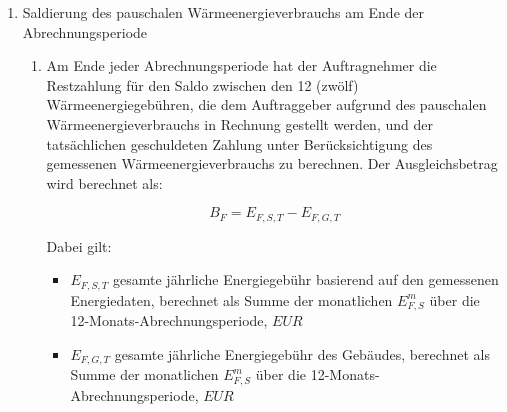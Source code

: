 \begin{enumerate}
\begin{enumerate}
	\item Der Auftragnehmer hat jeden Monat die folgende Tabelle für die Berechnung der monatlichen Wärmeenergiegebühr auszufüllen:


\begin{center}
\begin{tabu}{|X|X|X|X|X|X|} \tabucline{}
{{with translate "au" .Contract.Tables.calc_energy_fee}} %
	{{.Columns | column}} \\\tabucline{}
	{{range .Headers}} {{.|row}} \\\tabucline{} {{end}} %
	{{range .Rows}} {{.|row}} \\\tabucline{} {{end}} %
	\bfseries {{total .}} \\\tabucline{} %
{{end}}
\end{tabu}
\end{center}

	\item Der Auftragnehmer hat dem Verwalter des Auftraggebers monatlich die gesamte monatliche Wärmeenergiegebühr in Rechnung ($E^m_{F,G}$). zu stellen. Der Verwalter hat sie den Wohnungseigentümern anteilig in Rechnung zu stellen.
\end{enumerate}

\item{Saldierung des pauschalen Wärmeenergieverbrauchs am Ende der Abrechnungsperiode}

\begin{enumerate}
\item Am Ende jeder Abrechnungsperiode hat der Auftragnehmer die Restzahlung für den Saldo zwischen den 12 (zwölf) Wärmeenergiegebühren, die dem Auftraggeber aufgrund des pauschalen Wärmeenergieverbrauchs in Rechnung gestellt werden, und der tatsächlichen geschuldeten Zahlung unter Berücksichtigung des gemessenen Wärmeenergieverbrauchs zu berechnen. Der Ausgleichsbetrag wird berechnet als:
  
\[ B_F = E_{F,S,T} - E_{F,G,T} \]

Dabei gilt:

\begin{itemize}[label={}]
	\item $E_{F,S,T}$ \quad gesamte jährliche Energiegebühr basierend auf den gemessenen Energiedaten, berechnet als Summe der monatlichen $E^{m}_{F,S}$ über die 12-Monats-Abrechnungsperiode, $EUR$
	\item $E_{F,G,T}$  \quad gesamte jährliche Energiegebühr des Gebäudes, berechnet als Summe der monatlichen $E^{m}_{F,S}$ über die 12-Monats-Abrechnungsperiode, $EUR$
\end{itemize}


\end{enumerate}
\end{enumerate}
